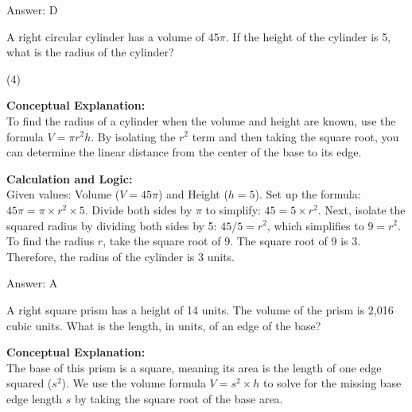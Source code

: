 \documentclass[11pt,paper=a4,answers]{exam}
\begin{document}
\begin{questions}
\begin{solution}
\vspace{30pt}

Answer: \colorbox{yellow!100}{D}
\end{solution}

\vspace{60pt}

\question
A right circular cylinder has a volume of $45\pi$. If the height of the cylinder is 5, what is the radius of the cylinder?
\begin{tasks}(4)
\end{tasks}

\begin{solution}
\textbf{Conceptual Explanation:} \\
To find the radius of a cylinder when the volume and height are known, use the formula $V = \pi r^2 h$. By isolating the $r^2$ term and then taking the square root, you can determine the linear distance from the center of the base to its edge.

\vspace{30pt}

\textbf{Calculation and Logic:} \\
Given values: Volume ($V = 45\pi$) and Height ($h = 5$). Set up the formula: $45\pi = \pi \times r^2 \times 5$. Divide both sides by $\pi$ to simplify: $45 = 5 \times r^2$. Next, isolate the squared radius by dividing both sides by 5: $45 / 5 = r^2$, which simplifies to $9 = r^2$. To find the radius $r$, take the square root of 9. The square root of 9 is 3. Therefore, the radius of the cylinder is 3 units.

\vspace{30pt}

Answer: \colorbox{yellow!100}{A}
\end{solution}

\vspace{60pt}

\question
A right square prism has a height of 14 units. The volume of the prism is 2,016 cubic units. What is the length, in units, of an edge of the base?

\begin{solution}
\textbf{Conceptual Explanation:} \\
The base of this prism is a square, meaning its area is the length of one edge squared ($s^2$). We use the volume formula $V = s^2 \times h$ to solve for the missing base edge length $s$ by taking the square root of the base area.


\end{solution}
\end{questions}
\end{document}
